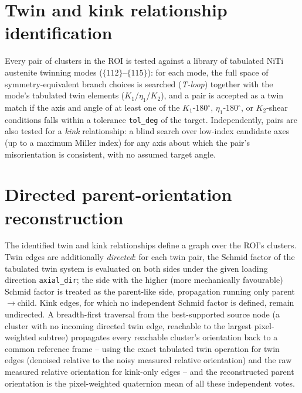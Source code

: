 \documentclass[11pt]{article}
\begin{document}
\section{Twin and kink relationship identification}

Every pair of clusters in the ROI is tested against a library of tabulated
NiTi austenite twinning modes ($\{112\}$--$\{115\}$): for each mode, the
full space of symmetry-equivalent branch choices is searched
(\emph{T-loop}) together with the mode's tabulated twin elements
($K_1$/$\eta_1$/$K_2$), and a pair is accepted as a twin match if the
axis and angle of at least one of the $K_1$-180$^\circ$,
$\eta_1$-180$^\circ$, or $K_2$-shear conditions falls within a tolerance
\texttt{tol\_deg} of the target. Independently, pairs are also tested for
a \emph{kink} relationship: a blind search over low-index candidate axes
(up to a maximum Miller index) for any axis about which the pair's
misorientation is consistent, with no assumed target angle.

\section{Directed parent-orientation reconstruction}

The identified twin and kink relationships define a graph over the ROI's
clusters. Twin edges are additionally \emph{directed}: for each twin pair,
the Schmid factor of the tabulated twin system is evaluated on both sides
under the given loading direction \texttt{axial\_dir}; the side with the
higher (more mechanically favourable) Schmid factor is treated as the
parent-like side, propagation running only parent$\to$child. Kink edges,
for which no independent Schmid factor is defined, remain undirected. A
breadth-first traversal from the best-supported source node (a cluster
with no incoming directed twin edge, reachable to the largest pixel-weighted
subtree) propagates every reachable cluster's orientation back to a common
reference frame -- using the exact tabulated twin operation for twin edges
(denoised relative to the noisy measured relative orientation) and the raw
measured relative orientation for kink-only edges -- and the reconstructed
parent orientation is the pixel-weighted quaternion mean of all these
independent votes.
\end{document}
